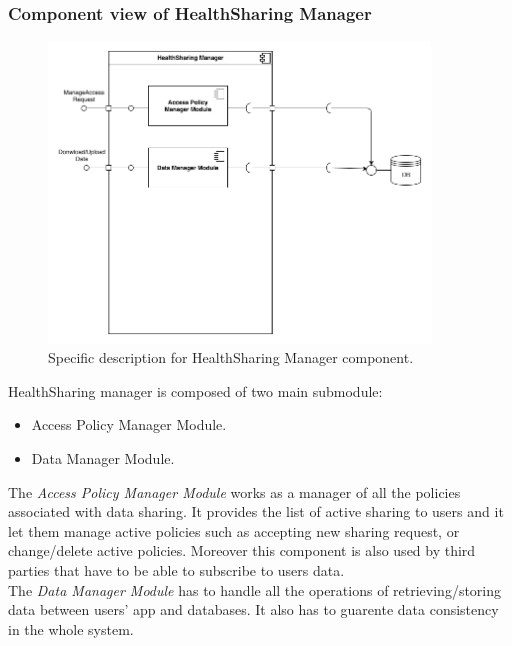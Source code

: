 \documentclass[DD.tex]{subfiles}
\begin{document}
\subsubsection{Component view of HealthSharing Manager}
\begin{figure}[h]
	\centering
	\includegraphics[height=8.00cm,keepaspectratio]{Figures/HealthSharingManagerComponent}
	\caption{Specific description for HealthSharing Manager component.}
\end{figure}

HealthSharing manager is composed of two main submodule: \begin{itemize}
	\item Access Policy Manager Module.
	\item Data Manager Module.
\end{itemize}

The \textit{Access Policy Manager Module} works as a manager of all the policies associated with data sharing. It provides the list of active sharing to users and it let them manage active policies such as accepting new sharing request, or change/delete active policies. Moreover this component is also used by third parties that have to be able to subscribe to users data.\\
The \textit{Data Manager Module} has to handle all the operations of retrieving/storing data between users' app and databases. It also has to guarente data consistency in the whole system.
\newpage
\end{document}
